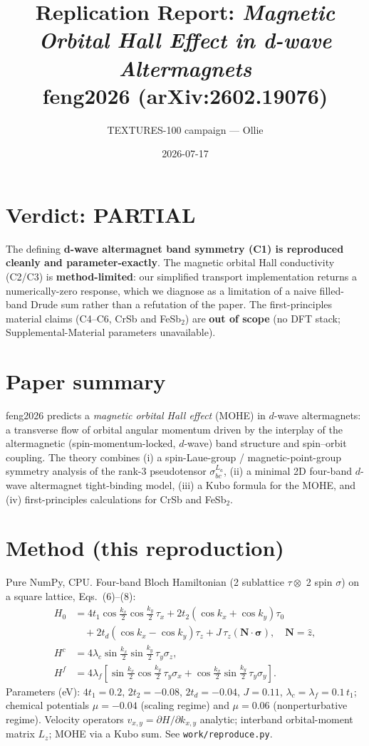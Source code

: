 \documentclass[11pt]{article}
\title{Replication Report: \textit{Magnetic Orbital Hall Effect in d-wave Altermagnets}\\ \large feng2026 (arXiv:2602.19076)}
\author{TEXTURES-100 campaign --- Ollie}
\date{2026-07-17}
\begin{document}
\maketitle

\section*{Verdict: PARTIAL}
The defining \textbf{d-wave altermagnet band symmetry (C1) is reproduced cleanly and parameter-exactly}. The magnetic orbital Hall conductivity (C2/C3) is \textbf{method-limited}: our simplified transport implementation returns a numerically-zero response, which we diagnose as a limitation of a naive filled-band Drude sum rather than a refutation of the paper. The first-principles material claims (C4--C6, CrSb and FeSb$_2$) are \textbf{out of scope} (no DFT stack; Supplemental-Material parameters unavailable).

\section{Paper summary}
feng2026 predicts a \emph{magnetic orbital Hall effect} (MOHE) in $d$-wave altermagnets: a transverse flow of orbital angular momentum driven by the interplay of the altermagnetic (spin-momentum-locked, $d$-wave) band structure and spin--orbit coupling. The theory combines (i) a spin-Laue-group / magnetic-point-group symmetry analysis of the rank-3 pseudotensor $\sigma^{L_a}_{bc}$, (ii) a minimal 2D four-band $d$-wave altermagnet tight-binding model, (iii) a Kubo formula for the MOHE, and (iv) first-principles calculations for CrSb and FeSb$_2$.

\section{Method (this reproduction)}
Pure NumPy, CPU. Four-band Bloch Hamiltonian (2 sublattice $\tau \otimes$ 2 spin $\sigma$) on a square lattice, Eqs.~(6)--(8):
\begin{align}
H_0 &= 4t_1 \cos\tfrac{k_x}{2}\cos\tfrac{k_y}{2}\,\tau_x + 2t_2(\cos k_x + \cos k_y)\tau_0 \nonumber\\
&\quad + 2t_d(\cos k_x - \cos k_y)\tau_z + J\,\tau_z(\mathbf{N}\cdot\boldsymbol{\sigma}),\quad \mathbf{N}=\hat z,\\
H^c &= 4\lambda_c \sin\tfrac{k_x}{2}\sin\tfrac{k_y}{2}\,\tau_y\sigma_z,\\
H^f &= 4\lambda_f\!\left[\sin\tfrac{k_x}{2}\cos\tfrac{k_y}{2}\,\tau_y\sigma_x + \cos\tfrac{k_x}{2}\sin\tfrac{k_y}{2}\,\tau_y\sigma_y\right].
\end{align}
Parameters (eV): $4t_1=0.2$, $2t_2=-0.08$, $2t_d=-0.04$, $J=0.11$, $\lambda_c=\lambda_f=0.1\,t_1$; chemical potentials $\mu=-0.04$ (scaling regime) and $\mu=0.06$ (nonperturbative regime). Velocity operators $v_{x,y}=\partial H/\partial k_{x,y}$ analytic; interband orbital-moment matrix $L_z$; MOHE via a Kubo sum. See \texttt{work/reproduce.py}.
\end{document}

